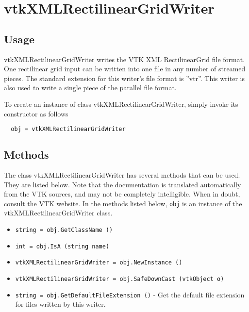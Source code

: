 \section{vtkXMLRectilinearGridWriter}

\subsection{Usage}

 vtkXMLRectilinearGridWriter writes the VTK XML RectilinearGrid
 file format.  One rectilinear grid input can be written into one
 file in any number of streamed pieces.  The standard extension for
 this writer's file format is ''vtr''.  This writer is also used to
 write a single piece of the parallel file format.

To create an instance of class vtkXMLRectilinearGridWriter, simply
invoke its constructor as follows
\begin{verbatim}
  obj = vtkXMLRectilinearGridWriter
\end{verbatim}
\subsection{Methods}

The class vtkXMLRectilinearGridWriter has several methods that can be used.
  They are listed below.
Note that the documentation is translated automatically from the VTK sources,
and may not be completely intelligible.  When in doubt, consult the VTK website.
In the methods listed below, \verb|obj| is an instance of the vtkXMLRectilinearGridWriter class.
\begin{itemize}
\item  \verb|string = obj.GetClassName ()|

\item  \verb|int = obj.IsA (string name)|

\item  \verb|vtkXMLRectilinearGridWriter = obj.NewInstance ()|

\item  \verb|vtkXMLRectilinearGridWriter = obj.SafeDownCast (vtkObject o)|

\item  \verb|string = obj.GetDefaultFileExtension ()| -  Get the default file extension for files written by this writer.

\end{itemize}
